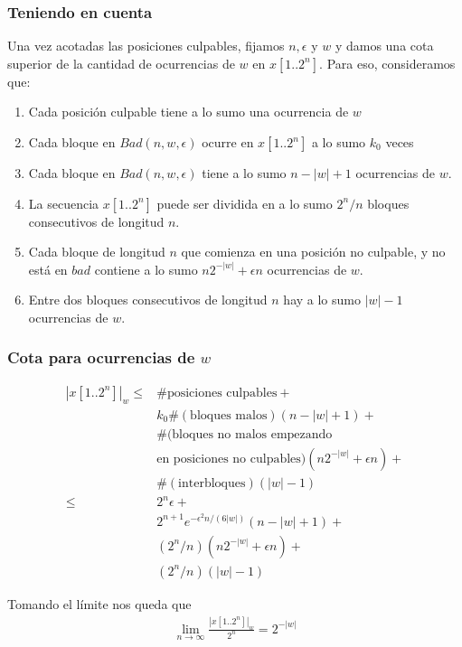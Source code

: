\documentclass[10pt,mathserif]{beamer}%
\begin{document}
\begin{frame}
  \frametitle{Teniendo en cuenta}
  Una vez acotadas las posiciones culpables, fijamos $ n, \epsilon$ y $w$ y damos una cota superior de la cantidad
  de ocurrencias de $w$ en $x[1 .. 2^n]$. Para eso, consideramos que:

\begin{enumerate}
\item Cada posición culpable tiene a lo sumo una ocurrencia de $w$
\item Cada bloque en $Bad(n, w, \epsilon)$ ocurre en $x[1.. 2^n]$ a lo sumo $k_0$ veces
\item Cada bloque en $Bad(n, w, \epsilon)$ tiene a lo sumo $n-|w|+1$ ocurrencias de $w$.
\item La secuencia $x[1..  2^n]$ puede ser dividida en a lo sumo $ 2^n/n$ bloques consecutivos de longitud $n$.  
\item Cada bloque de longitud $n$ que comienza en una posición no culpable,  y no está en $bad$ contiene a lo sumo $n 2^{-|w|} + \epsilon n $ ocurrencias de $w$.
\item Entre dos bloques consecutivos de longitud $n$ hay a lo sumo $|w|-1$ ocurrencias de $w$.
\end{enumerate}
\end{frame}

\begin{frame}
  \frametitle{Cota para ocurrencias de $w$}
  \begin{align*}
    |x[1.. 2^n]|_w \leq &
     \#\text{posiciones culpables} +
    \\& k_0 \#(\text{bloques malos}) (n-|w|+1)+
    \\& \#(\text{bloques no malos empezando}
    \\& \text{en posiciones no culpables}) (n 2^{-|w|} + \epsilon n)+
    \\&  \#(\text{interbloques})  (|w|-1)
    \\
    \leq& 2^n \epsilon + 
    \\& 2^{n+1} e^{-\epsilon^2 n/(6|w|)} (n-|w|+1)+
    \\&  ( 2^n /n) (n 2^{-|w|} + \epsilon n)+
    \\&  ( 2^n/n) (|w|-1)
    \end{align*}

    \pause
    Tomando el límite nos queda que\begin{align*}
      \lim_{n\to \infty}\frac{|x[1.. 2^n]|_w }{ 2^n}= {2^{-|w|}}
      \end{align*}
      
\end{frame}
\end{document}
